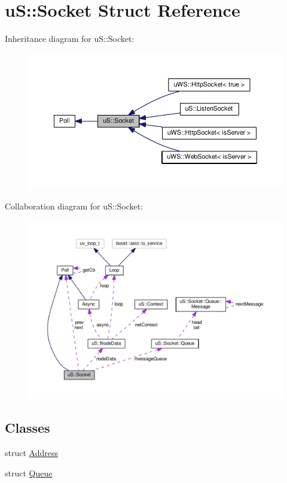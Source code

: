 \hypertarget{structu_s_1_1_socket}{}\section{uS\+:\+:Socket Struct Reference}
\label{structu_s_1_1_socket}


Inheritance diagram for uS\+:\+:Socket\+:
\nopagebreak
\begin{figure}[H]
\begin{center}
\leavevmode
\includegraphics[width=350pt]{structu_s_1_1_socket__inherit__graph}
\end{center}
\end{figure}


Collaboration diagram for uS\+:\+:Socket\+:
\nopagebreak
\begin{figure}[H]
\begin{center}
\leavevmode
\includegraphics[width=350pt]{structu_s_1_1_socket__coll__graph}
\end{center}
\end{figure}
\subsection*{Classes}
\begin{DoxyCompactItemize}
\item 
struct \mbox{\hyperlink{structu_s_1_1_socket_1_1_address}{Address}}
\item 
struct \mbox{\hyperlink{structu_s_1_1_socket_1_1_queue}{Queue}}
\end{DoxyCompactItemize}
